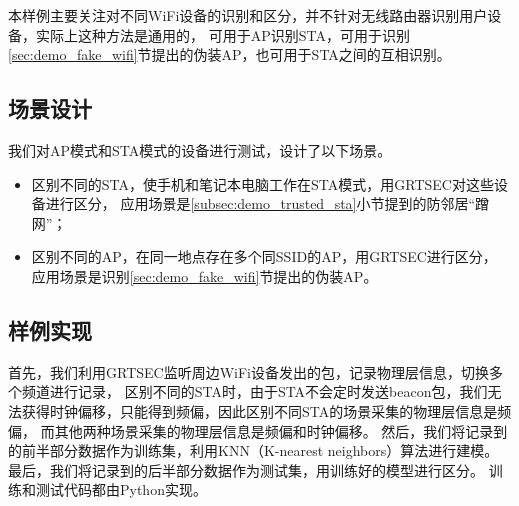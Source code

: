 		本样例主要关注对不同WiFi设备的识别和区分，并不针对无线路由器识别用户设备，实际上这种方法是通用的，
		可用于AP识别STA，可用于识别\ref{sec:demo_fake_wifi}节提出的伪装AP，也可用于STA之间的互相识别。

		\subsection{场景设计}
		我们对AP模式和STA模式的设备进行测试，设计了以下场景。
			\begin{itemize}
				\item 区别不同的STA，使手机和笔记本电脑工作在STA模式，用GRTSEC对这些设备进行区分，
				应用场景是\ref{subsec:demo_trusted_sta}小节提到的防邻居“蹭网”；
				\item 区别不同的AP，在同一地点存在多个同SSID的AP，用GRTSEC进行区分，
				应用场景是识别\ref{sec:demo_fake_wifi}节提出的伪装AP。
			\end{itemize}

		\subsection{样例实现}
		首先，我们利用GRTSEC监听周边WiFi设备发出的包，记录物理层信息，切换多个频道进行记录，
		区别不同的STA时，由于STA不会定时发送beacon包，我们无法获得时钟偏移，只能得到频偏，因此区别不同STA的场景采集的物理层信息是频偏，
		而其他两种场景采集的物理层信息是频偏和时钟偏移。
		然后，我们将记录到的前半部分数据作为训练集，利用KNN（K-nearest neighbors）算法进行建模。
		最后，我们将记录到的后半部分数据作为测试集，用训练好的模型进行区分。
		训练和测试代码都由Python实现。
